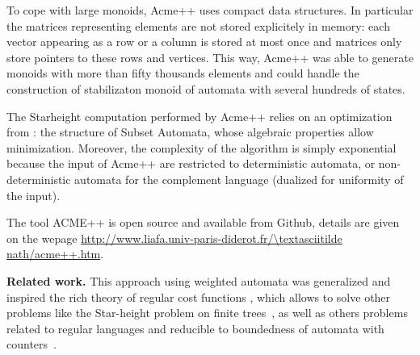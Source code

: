To cope with large monoids, Acme++ uses compact data structures. In particular the matrices representing elements are not stored explicitely in memory: each vector appearing as a row or a column is stored at most once and matrices only store pointers to these rows and vertices. This way, Acme++ was able to generate monoids with more than fifty thousands elements and could handle the construction of stabilizaton monoid of automata with several hundreds of states.

The Starheight computation performed by Acme++ relies on an optimization from \cite{CL08sh}: the structure of Subset Automata, whose algebraic properties allow minimization. Moreover, the complexity of the algorithm is simply exponential because the input of Acme++ are restricted to deterministic automata, or non-deterministic automata for the complement language (dualized for uniformity of the input).

The tool ACME++ is open source and available from Github, details are given on the wepage
\url{http://www.liafa.univ-paris-diderot.fr/\textasciitilde nath/acme++.htm}.

\textbf{Related work.}
This approach using weighted automata was generalized and inspired the rich theory of regular cost functions \cite{Colcombet09}, which allows to solve other problems 
like the Star-height problem on finite trees~\cite{CL08sh}, as well as others problems related to regular languages and reducible to boundedness of automata with counters~\cite{CL08sh,CL08b,CKLB13}.


